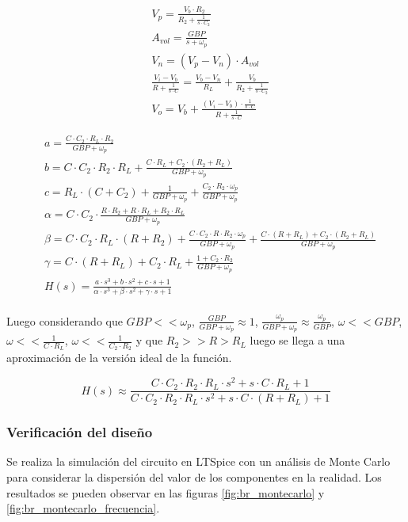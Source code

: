 \begin{align*}
    & V_p = \frac{V_b \cdot R_2}{R_2 + \frac{1}{s \cdot C_2}} \\
    & A_{vol} = \frac{GBP}{s + \omega_p} \\
    & V_n = (V_p - V_n) \cdot A_{vol} \\
    & \frac{V_i - V_b}{R + \frac{1}{s \cdot C}} = \frac{V_b - V_n}{R_L} + \frac{V_b}{R_2 + \frac{1}{s \cdot C_2}} \\
    & V_o = V_b + \frac{(V_i - V_b) \cdot \frac{1}{s \cdot C}}{R + \frac{1}{s \cdot C}}
\end{align*}

\begin{align*}
    & a = \frac{C \cdot C_2 \cdot R_L \cdot R_2}{GBP + \omega_p}\\
    & b = C \cdot C_2 \cdot R_2 \cdot R_L + \frac{C \cdot R_L + C_2 \cdot (R_2 + R_L)}{GBP + \omega_p}\\
    & c = R_L \cdot (C + C_2) + \frac{1}{GBP + \omega_p} + \frac{C_2 \cdot R_2 \cdot \omega_p}{GBP + \omega_p}\\
    & \alpha = C \cdot C_2 \cdot \frac{R \cdot R_2 + R \cdot R_L + R_2 \cdot R_L}{GBP + \omega_p}\\
    & \beta = C \cdot C_2 \cdot R_L \cdot ( R + R_2) + \frac{C \cdot C_2 \cdot R \cdot R_2 \cdot \omega_p}{GBP + \omega_p} + \frac{C \cdot (R + R_L) + C_2 \cdot(R_2 + R_L) }{GBP + \omega_p}\\
    & \gamma = C \cdot(R + R_L) + C_2 \cdot R_L + \frac{1 + C_2 \cdot R_2}{GBP + \omega_p} \\
    & H(s) = \frac{a \cdot s^{3} + b \cdot s^{2} + c \cdot s + 1}{\alpha \cdot s^{3} + \beta \cdot s^{2} + \gamma \cdot s + 1} \\
\end{align*}

Luego considerando que $GBP << \omega_p$, $\frac{GBP}{GBP + \omega_p} \approx 1$, $\frac{\omega_p}{GBP + \omega_p} \approx \frac{\omega_p}{GBP}$, 
$\omega << GBP$, $\omega << \frac{1}{C \cdot R_L}$, $\omega << \frac{1}{C_2 \cdot R_2}$ y que $R_2 >> R > R_L$ luego se llega a una aproximaci\'on de la versi\'on ideal de la funci\'on.

\begin{equation}
    H(s) \approx \frac{C \cdot C_2 \cdot R_2 \cdot R_L \cdot s^{2} + s \cdot C \cdot R_L + 1}{C \cdot C_2 \cdot R_2 \cdot R_L \cdot s^{2} + s \cdot C \cdot (R + R_L) + 1}    
\end{equation}

\subsubsection{Verificaci\'on del dise\~no}
Se realiza la simulaci\'on del circuito en LTSpice con un an\'alisis de Monte Carlo para considerar la dispersi\'on del valor de los componentes en la realidad.
Los resultados se pueden observar en las figuras \ref{fig:br_montecarlo} y \ref{fig:br_montecarlo_frecuencia}.

